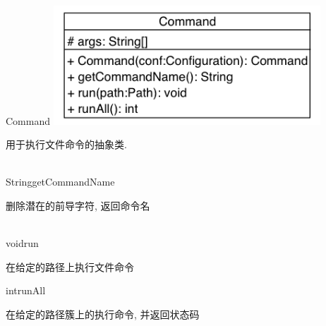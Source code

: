 \begin{XeClass}{Command}
\includegraphics[width=10cm]{cdig/Command.png}
     
 用于执行文件命令的抽象类.

    \begin{XeMethod}{\XeAbstract \\ \XePublic}{String}{getCommandName}
         
 删除潜在的前导字符, 返回命令名 

    \end{XeMethod}

    \begin{XeMethod}{\XeAbstract \\ \XeProtected}{void}{run}
         
 在给定的路径上执行文件命令

    \end{XeMethod}

    \begin{XeMethod}{\XePublic}{int}{runAll}
         
 在给定的路径簇上的执行命令, 并返回状态码

    \end{XeMethod}

\end{XeClass}
